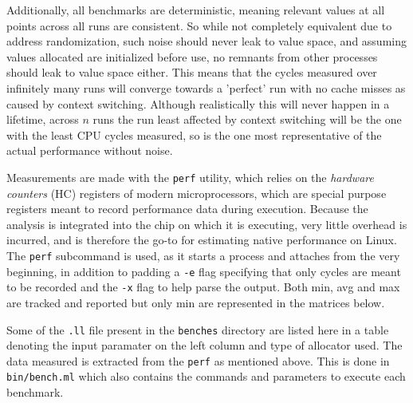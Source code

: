 \documentclass{article}
\begin{document}
Additionally, all benchmarks are deterministic, meaning relevant values at all points across all runs are consistent.
So while not completely equivalent due to address randomization, such noise should never leak to value space, and assuming values allocated are initialized before use, no remnants from other processes should leak to value space either.  %
This means that the cycles measured over infinitely many runs will converge towards a 'perfect' run with no cache misses as caused by context switching.
Although realistically this will never happen in a lifetime, across \(n\) runs the run least affected by context switching will be the one with the least CPU cycles measured, so is the one most representative of the actual performance without noise.

Measurements are made with the \lstinline!perf! utility, which relies on the \textit{hardware counters} (HC) registers of modern microprocessors, which are special purpose registers meant to record performance data during execution. Because the analysis is integrated into the chip on which it is executing, very little overhead is incurred, and is therefore the go-to for estimating native performance on Linux. The \lstinline!perf! subcommand is used, as it starts a process and attaches from the very beginning, in addition to padding a \lstinline!-e! flag specifying that only cycles are meant to be recorded and the \lstinline!-x! flag to help parse the output. Both min, avg and max are tracked and reported but only min are represented in the matrices below.

Some of the \texttt{.ll} file present in the \texttt{benches} directory are listed here in a table denoting the input paramater on the left column and type of allocator used.
The data measured is extracted from the \texttt{perf} as mentioned above. This is done in \texttt{bin/bench.ml} which also contains the commands and parameters to execute each benchmark.



%






\end{document}
